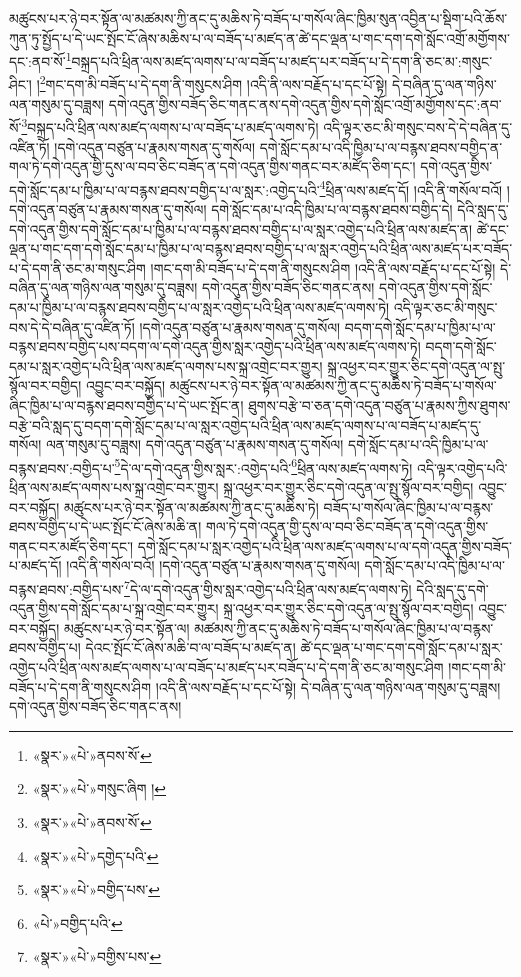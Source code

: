 མཚུངས་པར་ཉེ་བར་སྟོན་ལ་མཚམས་ཀྱི་ནང་དུ་མཆིས་ཏེ་བཟོད་པ་གསོལ་ཞིང་ཁྱིམ་སུན་འབྱིན་པ་སྡིག་པའི་ཆོས་ཀུན་ཏུ་སྤྱོད་པ་དེ་ཡང་སྤོང་ངོ་ཞེས་མཆིས་པ་ལ་བཟོད་པ་མཛད་ན་ཚེ་དང་ལྡན་པ་གང་དག་དགེ་སློང་འགྲོ་མགྱོགས་དང་:ནབ་སོ་\footnote{«སྣར་»«པེ་»ནབས་སོ་}བསྐྲད་པའི་ཕྲིན་ལས་མཛད་ལགས་པ་ལ་བཟོད་པ་མཛད་པར་བཟོད་པ་དེ་དག་ནི་ཅང་མ་:གསུང་ཤིང་། །\footnote{«སྣར་»«པེ་»གསུང་ཞིག །}གང་དག་མི་བཟོད་པ་དེ་དག་ནི་གསུངས་ཤིག །འདི་ནི་ལས་བརྗོད་པ་དང་པོ་སྟེ། དེ་བཞིན་དུ་ལན་གཉིས་ལན་གསུམ་དུ་བཟླས། དགེ་འདུན་གྱིས་བཟོད་ཅིང་གནང་ནས་དགེ་འདུན་གྱིས་དགེ་སློང་འགྲོ་མགྱོགས་དང་:ནབ་སོ་\footnote{«སྣར་»«པེ་»ནབས་སོ་}བསྐྲད་པའི་ཕྲིན་ལས་མཛད་ལགས་པ་ལ་བཟོད་པ་མཛད་ལགས་ཏེ། འདི་ལྟར་ཅང་མི་གསུང་བས་དེ་དེ་བཞིན་དུ་འཛིན་ཏོ། །དགེ་འདུན་བཙུན་པ་རྣམས་གསན་དུ་གསོལ། དགེ་སློང་དམ་པ་འདི་ཁྱིམ་པ་ལ་བརྙས་ཐབས་བགྱིད་ན་གལ་ཏེ་དགེ་འདུན་གྱི་དུས་ལ་བབ་ཅིང་བཟོད་ན་དགེ་འདུན་གྱིས་གནང་བར་མཛོད་ཅིག་དང་། དགེ་འདུན་གྱིས་དགེ་སློང་དམ་པ་ཁྱིམ་པ་ལ་བརྙས་ཐབས་བགྱིད་པ་ལ་སླར་:འགྱེད་པའི་\footnote{«སྣར་»«པེ་»དགྱེད་པའི་}ཕྲིན་ལས་མཛད་དོ། །འདི་ནི་གསོལ་བའོ། །དགེ་འདུན་བཙུན་པ་རྣམས་གསན་དུ་གསོལ། དགེ་སློང་དམ་པ་འདི་ཁྱིམ་པ་ལ་བརྙས་ཐབས་བགྱིད་དེ། དེའི་སླད་དུ་དགེ་འདུན་གྱིས་དགེ་སློང་དམ་པ་ཁྱིམ་པ་ལ་བརྙས་ཐབས་བགྱིད་པ་ལ་སླར་འགྱེད་པའི་ཕྲིན་ལས་མཛད་ན། ཚེ་དང་ལྡན་པ་གང་དག་དགེ་སློང་དམ་པ་ཁྱིམ་པ་ལ་བརྙས་ཐབས་བགྱིད་པ་ལ་སླར་འགྱེད་པའི་ཕྲིན་ལས་མཛད་པར་བཟོད་པ་དེ་དག་ནི་ཅང་མ་གསུང་ཤིག །གང་དག་མི་བཟོད་པ་དེ་དག་ནི་གསུངས་ཤིག །འདི་ནི་ལས་བརྗོད་པ་དང་པོ་སྟེ། དེ་བཞིན་དུ་ལན་གཉིས་ལན་གསུམ་དུ་བཟླས། དགེ་འདུན་གྱིས་བཟོད་ཅིང་གནང་ནས། དགེ་འདུན་གྱིས་དགེ་སློང་དམ་པ་ཁྱིམ་པ་ལ་བརྙས་ཐབས་བགྱིད་པ་ལ་སླར་འགྱེད་པའི་ཕྲིན་ལས་མཛད་ལགས་ཏེ། འདི་ལྟར་ཅང་མི་གསུང་བས་དེ་དེ་བཞིན་དུ་འཛིན་ཏོ། །དགེ་འདུན་བཙུན་པ་རྣམས་གསན་དུ་གསོལ། བདག་དགེ་སློང་དམ་པ་ཁྱིམ་པ་ལ་བརྙས་ཐབས་བགྱིད་པས་བདག་ལ་དགེ་འདུན་གྱིས་སླར་འགྱེད་པའི་ཕྲིན་ལས་མཛད་ལགས་ཏེ། བདག་དགེ་སློང་དམ་པ་སླར་འགྱེད་པའི་ཕྲིན་ལས་མཛད་ལགས་པས་སྐྲ་འགྲེང་བར་གྱུར། སྐྲ་འཕྱར་བར་གྱུར་ཅིང་དགེ་འདུན་ལ་སྤུ་སྙོལ་བར་བགྱིད། འབྱུང་བར་བསྐྱོད། མཚུངས་པར་ཉེ་བར་སྟོན་ལ་མཚམས་ཀྱི་ནང་དུ་མཆིས་ཏེ་བཟོད་པ་གསོལ་ཞིང་ཁྱིམ་པ་ལ་བརྙས་ཐབས་བགྱིད་པ་དེ་ཡང་སྤོང་ན། ཐུགས་བརྩེ་བ་ཅན་དགེ་འདུན་བཙུན་པ་རྣམས་ཀྱིས་ཐུགས་བརྩེ་བའི་སླད་དུ་བདག་དགེ་སློང་དམ་པ་ལ་སླར་འགྱེད་པའི་ཕྲིན་ལས་མཛད་ལགས་པ་ལ་བཟོད་པ་མཛད་དུ་གསོལ། ལན་གསུམ་དུ་བཟླས། དགེ་འདུན་བཙུན་པ་རྣམས་གསན་དུ་གསོལ། དགེ་སློང་དམ་པ་འདི་ཁྱིམ་པ་ལ་བརྙས་ཐབས་:བགྱིད་པ་\footnote{«སྣར་»«པེ་»བགྱིད་པས་}དེ་ལ་དགེ་འདུན་གྱིས་སླར་:འགྱེད་པའི་\footnote{«པེ་»བགྱིད་པའི་}ཕྲིན་ལས་མཛད་ལགས་ཏེ། འདི་ལྟར་འགྱེད་པའི་ཕྲིན་ལས་མཛད་ལགས་པས་སྐྲ་འགྲེང་བར་གྱུར། སྐྲ་འཕྱར་བར་གྱུར་ཅིང་དགེ་འདུན་ལ་སྤུ་སྙོལ་བར་བགྱིད། འབྱུང་བར་བསྐྱོད། མཚུངས་པར་ཉེ་བར་སྟོན་ལ་མཚམས་ཀྱི་ནང་དུ་མཆིས་ཏེ། བཟོད་པ་གསོལ་ཞིང་ཁྱིམ་པ་ལ་བརྙས་ཐབས་བགྱིད་པ་དེ་ཡང་སྤོང་ངོ་ཞེས་མཆི་ན། གལ་ཏེ་དགེ་འདུན་གྱི་དུས་ལ་བབ་ཅིང་བཟོད་ན་དགེ་འདུན་གྱིས་གནང་བར་མཛོད་ཅིག་དང་། དགེ་སློང་དམ་པ་སླར་འགྱེད་པའི་ཕྲིན་ལས་མཛད་ལགས་པ་ལ་དགེ་འདུན་གྱིས་བཟོད་པ་མཛད་དོ། །འདི་ནི་གསོལ་བའོ། །དགེ་འདུན་བཙུན་པ་རྣམས་གསན་དུ་གསོལ། དགེ་སློང་དམ་པ་འདི་ཁྱིམ་པ་ལ་བརྙས་ཐབས་:བགྱིད་པས་\footnote{«སྣར་»«པེ་»བགྱིས་པས་}དེ་ལ་དགེ་འདུན་གྱིས་སླར་འགྱེད་པའི་ཕྲིན་ལས་མཛད་ལགས་ཏེ། དེའི་སླད་དུ་དགེ་འདུན་གྱིས་དགེ་སློང་དམ་པ་སྐྲ་འགྲེང་བར་གྱུར། སྐྲ་འཕྱར་བར་གྱུར་ཅིང་དགེ་འདུན་ལ་སྤུ་སྙོལ་བར་བགྱིད། འབྱུང་བར་བསྐྱོད། མཚུངས་པར་ཉེ་བར་སྟོན་ལ། མཚམས་ཀྱི་ནང་དུ་མཆིས་ཏེ་བཟོད་པ་གསོལ་ཞིང་ཁྱིམ་པ་ལ་བརྙས་ཐབས་བགྱིད་པ། དེའང་སྤོང་ངོ་ཞེས་མཆི་བ་ལ་བཟོད་པ་མཛད་ན། ཚེ་དང་ལྡན་པ་གང་དག་དགེ་སློང་དམ་པ་སླར་འགྱེད་པའི་ཕྲིན་ལས་མཛད་ལགས་པ་ལ་བཟོད་པ་མཛད་པར་བཟོད་པ་དེ་དག་ནི་ཅང་མ་གསུང་ཤིག །གང་དག་མི་བཟོད་པ་དེ་དག་ནི་གསུངས་ཤིག །འདི་ནི་ལས་བརྗོད་པ་དང་པོ་སྟེ། དེ་བཞིན་དུ་ལན་གཉིས་ལན་གསུམ་དུ་བཟླས། དགེ་འདུན་གྱིས་བཟོད་ཅིང་གནང་ནས། 